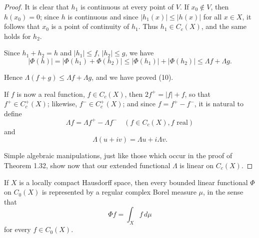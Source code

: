 \begin{proof}
  It is clear that $h_1$ is continuous at every point of $V$. If $x_0 \notin V$, then $h(x_0) = 0$; since $h$ is continuous and since $|h_1(x)| \leq |h(x)|$ for all $x \in X$, it follows that $x_0$ is a point of continuity of $h_1$. Thus $h_1 \in C_c(X)$, and the same holds for $h_2$.

  Since $h_1 + h_2 = h$ and $|h_1| \leq f$, $|h_2| \leq g$, we have
  \begin{equation}
    |\Phi(h)| = |\Phi(h_1) + \Phi(h_2)| \leq |\Phi(h_1)| + |\Phi(h_2)| \leq \Lambda f + \Lambda g.
  \end{equation}

  Hence $\Lambda(f + g) \leq \Lambda f + \Lambda g$, and we have proved (10).

  If $f$ is now a real function, $f \in C_c(X)$, then $2f^+ = |f| + f$, so that $f^+ \in C_c^+(X)$; likewise, $f^- \in C_c^+(X)$; and since $f = f^+ - f^-$, it is natural to define
  \begin{equation}
    \Lambda f = \Lambda f^+ - \Lambda f^- \quad (f \in C_c(X), f \text{ real}) \tag{13}
  \end{equation}
  and
  \begin{equation}
    \Lambda(u + iv) = \Lambda u + i\Lambda v. \tag{14}
  \end{equation}

  Simple algebraic manipulations, just like those which occur in the proof of Theorem 1.32, show now that our extended functional $\Lambda$ is linear on $C_c(X)$.
\end{proof}

\begin{theorem}[Rudin 6.19]
  \label{integral_rieszMeasure}
  If $X$ is a locally compact Hausdorff space, then every bounded linear functional $\Phi$ on $C_0(X)$ is represented by a regular complex Borel measure $\mu$, in the sense that
  \begin{equation}
    \Phi f = \int_X f \, d\mu \tag{1}
  \end{equation}
  for every $f \in C_0(X)$.
\end{theorem}

